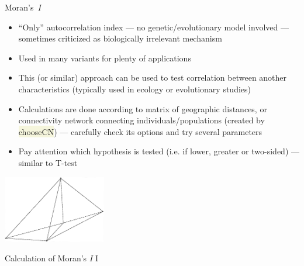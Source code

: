 \documentclass[compress, ucs, xelatex, 11pt, xcolor=svgnames, aspectratio=169,
	hyperref={
		bookmarks=true,
		unicode=true,
		colorlinks=true,
		pdftitle={Molecular data in R},
		plainpages=false,
		pdfauthor={Vojtech Zeisek},
		pdfsubject={Course about phylogeny and evolution in R},
		pdfcreator={XeLaTeX},
		pdfkeywords={R, evolution, phylogeny, molecular data},
		linkcolor=Crimson, %
		anchorcolor=Magenta, %
		citecolor=Magenta, %
		filecolor=Magenta, %
		menucolor=Magenta, %
		urlcolor=DodgerBlue, %
		pdftex},
	url={hyphens, lowtilde} %
	]{beamer}
\renewcommand{\texttt}[1]{\colorbox{Beige}{{\ttfamily #1}}}
\begin{document}
\begin{frame}{Moran's~\textit{I}}
	\begin{multicols}{2}
		\begin{itemize}
			\item \enquote{Only} autocorrelation index --- no genetic/evolutionary model involved --- sometimes criticized as biologically irrelevant mechanism
			\item Used in many variants for plenty of applications
			\item This (or similar) approach can be used to test correlation between another characteristics (typically used in ecology or evolutionary studies)
			\item Calculations are done according to matrix of geographic distances, or connectivity network connecting individuals/populations (created by \texttt{chooseCN}) --- carefully check its options and try several parameters
			\item Pay attention which hypothesis is tested (i.e. if lower, greater or two-sided) --- similar to T-test
		\end{itemize}
		\begin{center}
			\includegraphics[width=4.5cm]{choosecn.png}
		\end{center}
	\end{multicols}
\end{frame}

\begin{frame}[fragile]{Calculation of Moran's \textit{I} I}
\end{frame}
\end{document}
